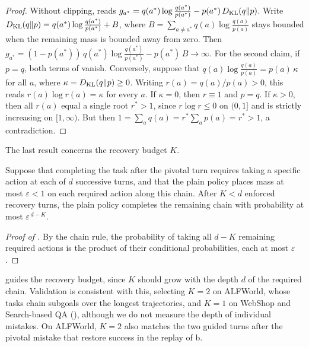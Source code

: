 \begin{proof}
Without clipping,  reads $g_{a^{*}} = q(a^{*}) \log \tfrac{q(a^{*})}{p(a^{*})} - p(a^{*})\, D_{\mathrm{KL}}(q \| p)$. Write $D_{\mathrm{KL}}(q \| p) = q(a^{*}) \log \tfrac{q(a^{*})}{p(a^{*})} + B$, where $B = \sum_{a \neq a^{*}} q(a) \log \tfrac{q(a)}{p(a)}$ stays bounded when the remaining mass is bounded away from zero. Then $g_{a^{*}} = (1 - p(a^{*}))\, q(a^{*}) \log \tfrac{q(a^{*})}{p(a^{*})} - p(a^{*})\, B \to \infty$. For the second claim, if $p = q$, both terms of  vanish. Conversely, suppose that $q(a) \log \tfrac{q(a)}{p(a)} = p(a)\, \kappa$ for all $a$, where $\kappa = D_{\mathrm{KL}}(q \| p) \ge 0$. Writing $r(a) = q(a)/p(a) > 0$, this reads $r(a) \log r(a) = \kappa$ for every $a$. If $\kappa = 0$, then $r \equiv 1$ and $p = q$. If $\kappa > 0$, then all $r(a)$ equal a single root $r^{*} > 1$, since $r \log r \le 0$ on $(0, 1]$ and is strictly increasing on $[1, \infty)$. But then $1 = \sum_a q(a) = r^{*} \sum_a p(a) = r^{*} > 1$, a contradiction.
\end{proof}

The last result concerns the recovery budget $K$.

\begin{proposition}
\label{prop:depth}
Suppose that completing the task after the pivotal turn requires taking a specific action at each of $d$ successive turns, and that the plain policy places mass at most $\varepsilon < 1$ on each required action along this chain. After $K < d$ enforced recovery turns, the plain policy completes the remaining chain with probability at most $\varepsilon^{\,d - K}$.
\end{proposition}

\begin{proof}[Proof of ]
By the chain rule, the probability of taking all $d - K$ remaining required actions is the product of their conditional probabilities, each at most $\varepsilon$.
\end{proof}

 guides the recovery budget, since $K$ should grow with the depth $d$ of the required chain. Validation is consistent with this, selecting $K=2$ on ALFWorld, whose tasks chain subgoals over the longest trajectories, and $K=1$ on WebShop and Search-based QA (), although we do not measure the depth of individual mistakes. On ALFWorld, $K=2$ also matches the two guided turns after the pivotal mistake that restore success in the replay of b.

